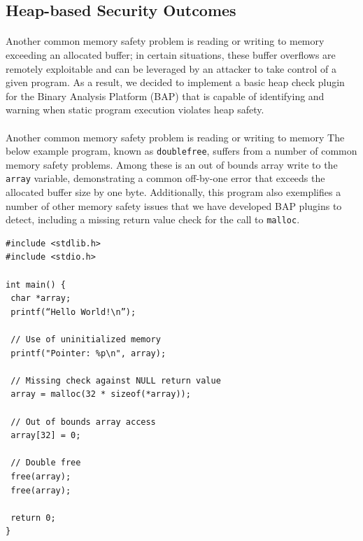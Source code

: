 \documentclass[letterpaper,11pt]{article}
\begin{document}
\subsection{Heap-based Security Outcomes}
\paragraph{}
Another common memory safety problem is reading or writing to memory
exceeding an allocated buffer; in certain situations, these buffer overflows
are remotely exploitable and can be leveraged by an attacker to take control
of a given program. As a result, we decided to implement a basic heap check
plugin for the Binary Analysis Platform (BAP) that is capable of identifying
and warning when static program execution violates heap safety.

\paragraph{}
Another common memory safety problem is reading or writing to memory
The below example program, known as \texttt{doublefree}, suffers from a number of
common memory safety problems. Among these is an out of bounds array write to
the \texttt{array} variable, demonstrating a common off-by-one error that exceeds
the allocated buffer size by one byte. Additionally, this program also
exemplifies a number of other memory safety issues that we have developed BAP
plugins to detect, including a missing return value check for the call to
\texttt{malloc}.

\begin{center}
\lstset{language=C, label=freefree,
caption=malloc\_free.c, breaklines=true, basicstyle=\tiny, numbers=left}
\begin{lstlisting}
#include <stdlib.h>
#include <stdio.h>

int main() {
 char *array;
 printf(“Hello World!\n”);

 // Use of uninitialized memory
 printf("Pointer: %p\n", array);

 // Missing check against NULL return value
 array = malloc(32 * sizeof(*array));

 // Out of bounds array access
 array[32] = 0;

 // Double free
 free(array);
 free(array);

 return 0;
}
\end{lstlisting}
\end{center}
\end{document}
